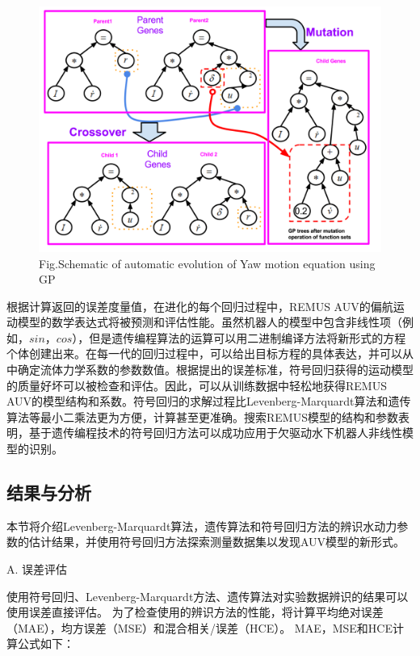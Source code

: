 \begin{figure}[!htp]
\centering
\includegraphics[width=14cm]{figure/chap3/GPevolution.png}
\label{fig:chap3:F2}
 {Fig.}{Schematic of automatic evolution of Yaw motion equation using GP }
\end{figure}

根据计算返回的误差度量值，在进化的每个回归过程中，REMUS AUV的偏航运动模型的数学表达式将被预测和评估性能。虽然机器人的模型中包含非线性项（例如，$sin$，$cos$），但是遗传编程算法的运算可以用二进制编译方法将新形式的方程个体创建出来。在每一代的回归过程中，可以给出目标方程的具体表达，并可以从中确定流体力学系数的参数数值。根据提出的误差标准，符号回归获得的运动模型的质量好坏可以被检查和评估。因此，可以从训练数据中轻松地获得REMUS AUV的模型结构和系数。符号回归的求解过程比Levenberg-Marquardt算法和遗传算法等最小二乘法更为方便，计算甚至更准确。搜索REMUS模型的结构和参数表明，基于遗传编程技术的符号回归方法可以成功应用于欠驱动水下机器人非线性模型的识别。

\subsection{结果与分析 }

本节将介绍Levenberg-Marquardt算法，遗传算法和符号回归方法的辨识水动力参数的估计结果，并使用符号回归方法探索测量数据集以发现AUV模型的新形式。

A. 误差评估

使用符号回归、Levenberg-Marquardt方法、遗传算法对实验数据辨识的结果可以使用误差直接评估。 为了检查使用的辨识方法的性能，将计算平均绝对误差（MAE），均方误差（MSE）和混合相关/误差（HCE）。  MAE，MSE和HCE计算公式如下：

